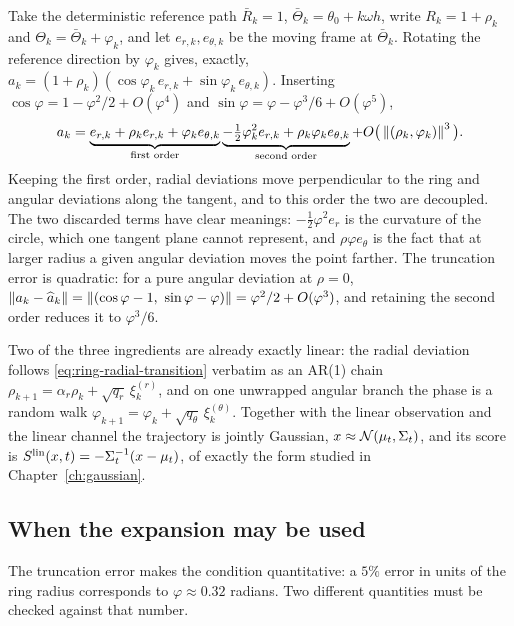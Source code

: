 Take the deterministic reference path $\bar R_k = 1$,
$\bar\Theta_k = \theta_0 + k\omega h$, write
$R_k = 1 + \rho_k$ and $\Theta_k = \bar\Theta_k + \varphi_k$, and let
$e_{r,k}, e_{\theta,k}$ be the moving frame at $\bar\Theta_k$. Rotating the
reference direction by $\varphi_k$ gives, exactly,
$a_k = (1+\rho_k)(\cos\varphi_k\, e_{r,k} + \sin\varphi_k\, e_{\theta,k})$.
Inserting $\cos\varphi = 1 - \varphi^2/2 + O(\varphi^4)$ and
$\sin\varphi = \varphi - \varphi^3/6 + O(\varphi^5)$,
\begin{equation}
  a_k
  = \underbrace{e_{r,k} + \rho_k e_{r,k} + \varphi_k e_{\theta,k}}_{\text{first order}}
    \underbrace{- \tfrac12 \varphi_k^2 e_{r,k}
                + \rho_k\varphi_k e_{\theta,k}}_{\text{second order}}
    + O\big(\left\lVert (\rho_k,\varphi_k) \right\rVert^3\big) .
  \label{eq:ring-taylor}
\end{equation}
Keeping the first order, radial deviations move perpendicular to the ring and
angular deviations along the tangent, and to this order the two are decoupled.
The two discarded terms have clear meanings: $-\tfrac12\varphi^2 e_r$ is the
curvature of the circle, which one tangent plane cannot represent, and
$\rho\varphi e_\theta$ is the fact that at larger radius a given angular
deviation moves the point farther. The truncation error is quadratic: for a
pure angular deviation at $\rho = 0$,
$\left\lVert a_k - \widehat a_k \right\rVert
= \left\lVert (\cos\varphi - 1,\ \sin\varphi - \varphi) \right\rVert
= \varphi^2/2 + O(\varphi^3)$, and retaining the second order reduces it to
$\varphi^3/6$.

Two of the three ingredients are already exactly linear: the radial deviation
follows \eqref{eq:ring-radial-transition} verbatim as an AR(1) chain
$\rho_{k+1} = \alpha_r\rho_k + \sqrt{q_r}\,\xi^{(r)}_k$, and on one unwrapped
angular branch the phase is a random walk
$\varphi_{k+1} = \varphi_k + \sqrt{q_\theta}\,\xi^{(\theta)}_k$. Together with
the linear observation and the linear channel the trajectory is jointly
Gaussian, $x \approx \mathcal{N}(\mu_t, \Sigma_t)$, and its score is
$S^{\mathrm{lin}}(x,t) = -\Sigma_t^{-1}(x - \mu_t)$, of exactly the form
studied in Chapter~\ref{ch:gaussian}.

\subsection{When the expansion may be used}\label{sec:ring-taylor-validity}

The truncation error makes the condition quantitative: a $5\%$ error in units
of the ring radius corresponds to $\varphi \approx 0.32$ radians. Two different
quantities must be checked against that number.

